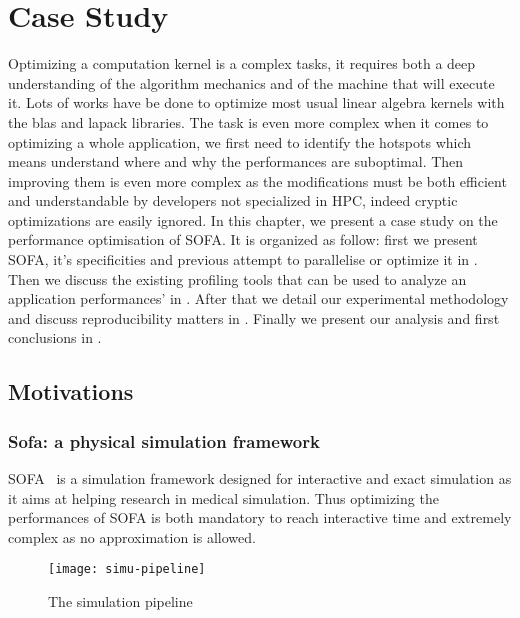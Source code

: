 \chapter{Case Study}
\label{chap:perf}

Optimizing a computation kernel is a complex tasks, it requires both a deep
understanding of the algorithm mechanics and of the machine that will execute
it. Lots of works have be done to optimize most usual linear algebra kernels
with the blas and lapack libraries.  The task is even more
complex when it comes to optimizing a whole application, we first need to
identify the hotspots which means understand where and why the performances
are suboptimal. Then improving them is even more complex as the modifications
must be both efficient and understandable by developers not specialized in
\gls{HPC}, indeed cryptic optimizations are easily ignored. 
In this chapter, we present a case study on the performance optimisation of
\gls{SOFA}. It is organized as follow: first we present \gls{SOFA}, it's
specificities and previous attempt to parallelise or optimize it in
. Then we discuss the existing profiling tools that can
be used to analyze an application performances' in . After
that we detail our experimental methodology and discuss reproducibility
matters in . Finally we present our analysis and first
conclusions in .

\section{Motivations}
\label{sec:motivations}

\subsection{Sofa: a physical simulation framework}

\gls{SOFA}~\cite{Allard07SOFA} is a simulation framework designed for
interactive and exact simulation as it aims at helping research in medical
simulation. Thus optimizing the performances of \gls{SOFA} is both mandatory
to reach interactive time and extremely complex as no approximation is
allowed.

\begin{figure}[htb]
    \centering
    \texttt{[image: simu-pipeline]}
    \caption[The simulation pipeline]{The simulation pipeline}
    \label{fig:simu-pipeline}
\end{figure}


